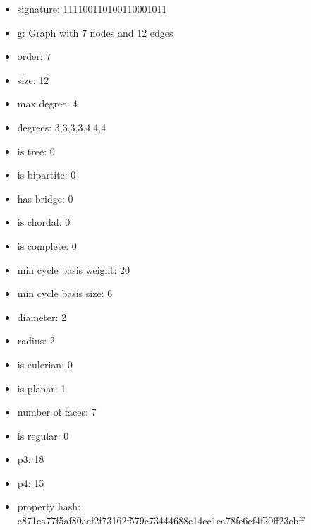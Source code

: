 \begin{itemize}
\item signature: 111100110100110001011
\item g: Graph with 7 nodes and 12 edges
\item order: 7
\item size: 12
\item max degree: 4
\item degrees: 3,3,3,3,4,4,4
\item is tree: 0
\item is bipartite: 0
\item has bridge: 0
\item is chordal: 0
\item is complete: 0
\item min cycle basis weight: 20
\item min cycle basis size: 6
\item diameter: 2
\item radius: 2
\item is eulerian: 0
\item is planar: 1
\item number of faces: 7
\item is regular: 0
\item p3: 18
\item p4: 15
\item property hash: e871ea77f5af80acf2f73162f579c73444688e14cc1ca78fe6ef4f20ff23ebff
\end{itemize}
\newpage
